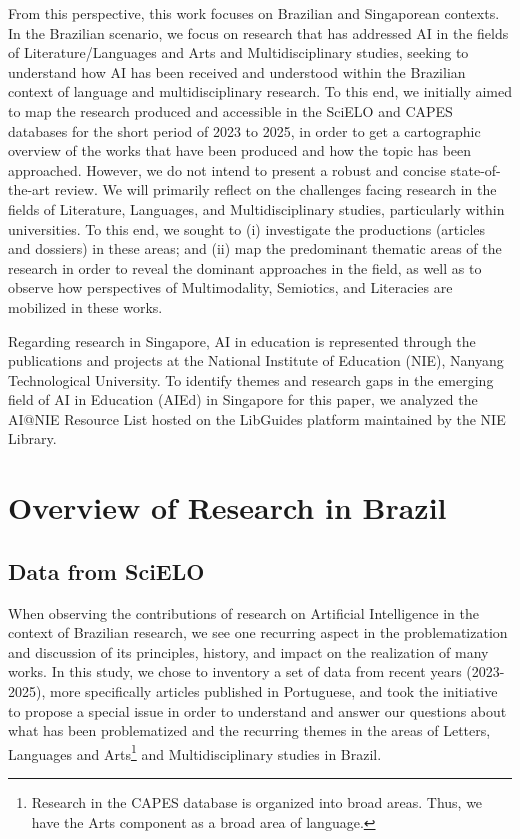 \documentclass[english]{textolivre}
\begin{document}
From this perspective, this work focuses on Brazilian and Singaporean contexts. In the Brazilian scenario, we focus on research that has addressed AI in the fields of Literature/Languages and Arts and Multidisciplinary studies, seeking to understand how AI has been received and understood within the Brazilian context of language and multidisciplinary research. To this end, we initially aimed to map the research produced and accessible in the SciELO and CAPES databases for the short period of 2023 to 2025, in order to get a cartographic overview of the works that have been produced and how the topic has been approached. However, we do not intend to present a robust and concise state-of-the-art review. We will primarily reflect on the challenges facing research in the fields of Literature, Languages, and Multidisciplinary studies, particularly within universities. To this end, we sought to (i) investigate the productions (articles and dossiers) in these areas; and (ii) map the predominant thematic areas of the research in order to reveal the dominant approaches in the field, as well as to observe how perspectives of Multimodality, Semiotics, and Literacies are mobilized in these works.

Regarding research in Singapore, AI in education is represented through the publications and projects at the National Institute of Education (NIE), Nanyang Technological University. To identify themes and research gaps in the emerging field of AI in Education (AIEd) in Singapore for this paper, we analyzed the AI@NIE Resource List hosted on the LibGuides platform maintained by the NIE Library.

\section{Overview of Research in Brazil}\label{sec-normas}
\subsection{Data from SciELO}
When observing the contributions of research on Artificial Intelligence in the context of Brazilian research, we see one recurring aspect in the problematization and discussion of its principles, history, and impact on the realization of many works. In this study, we chose to inventory a set of data from recent years (2023-2025), more specifically articles published in Portuguese, and took the initiative to propose a special issue in order to understand and answer our questions about what has been problematized and the recurring themes in the areas of Letters, Languages and Arts\footnote{Research in the CAPES database is organized into broad areas. Thus, we have the Arts component as a broad area of language.} and Multidisciplinary studies in Brazil.
\end{document}

